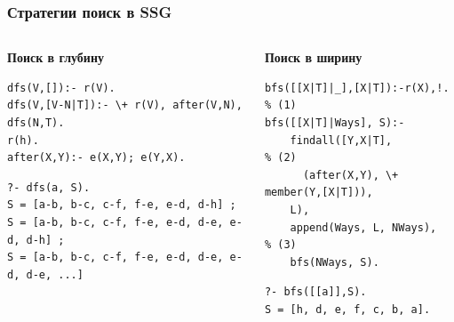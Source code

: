 \documentclass[10pt]{beamer}
\begin{document}
\begin{frame}[fragile]
  \frametitle{Стратегии поиск в SSG}
  \begin{center}\tiny
    \def\svgwidth{0.8\linewidth}
    \def\za{A}
    \def\zb{B}
    \def\zc{C}
    \def\ya{a)}
    \def\yb{b)}
    \def\yc{c)}
    
  \end{center}
\begin{columns}
  \begin{column}{0.5\textwidth}
    \textbf{Поиск в глубину}
\begin{verbatim}
dfs(V,[]):- r(V).
dfs(V,[V-N|T]):- \+ r(V), after(V,N), dfs(N,T).
r(h).
after(X,Y):- e(X,Y); e(Y,X).
\end{verbatim}
\begin{verbatim}
?- dfs(a, S).
S = [a-b, b-c, c-f, f-e, e-d, d-h] ;
S = [a-b, b-c, c-f, f-e, e-d, d-e, e-d, d-h] ;
S = [a-b, b-c, c-f, f-e, e-d, d-e, e-d, d-e, ...]
\end{verbatim}
    \mbox{}
  \end{column}
  \begin{column}{0.5\textwidth}
    \textbf{Поиск в ширину}
\begin{verbatim}
bfs([[X|T]|_],[X|T]):-r(X),!.   % (1)
bfs([[X|T]|Ways], S):-
    findall([Y,X|T],            % (2)
      (after(X,Y), \+ member(Y,[X|T])),
    L),
    append(Ways, L, NWays),     % (3)
    bfs(NWays, S).
\end{verbatim}
\begin{verbatim}
?- bfs([[a]],S).
S = [h, d, e, f, c, b, a].
\end{verbatim}
  \end{column}
\end{columns}
\end{frame}
\end{document}
